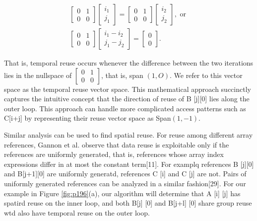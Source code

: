 $$
\begin{gathered}
{\left[\begin{array}{ll}
0 & 1 \\
0 & 0
\end{array}\right]\left[\begin{array}{l}
i_1 \\
j_1
\end{array}\right]=\left[\begin{array}{ll}
0 & 1 \\
0 & 0
\end{array}\right]\left[\begin{array}{l}
i_2 \\
j_2
\end{array}\right], \text { or }} \\
{\left[\begin{array}{ll}
0 & 1 \\
0 & 0
\end{array}\right]\left[\begin{array}{c}
i_1-i_2 \\
j_1-j_2
\end{array}\right]=\left[\begin{array}{l}
0 \\
0
\end{array}\right] .}
\end{gathered}
$$


That is, temporal reuse occurs whenever the difference between
the two iterations lies in the nullspace of \(
	\left[\begin{array}{ll}
		0 & 1 \\
		0 & 0
		\end{array}\right] \), that is,
span ${(1, O)}$. We refer to this vector space as the temporal reuse
vector space. This mathematical approach succinctly captures the
intuitive concept that the direction of reuse of B [j][0] lies along
the outer loop. This approach can handle more complicated access
patterns such as C[i+j] by representing their reuse vector space
as Span${ (1, -1)}$.

Similar analysis can be used to find spatial reuse. For reuse
among different array references, Gannon et al. observe that data
reuse is exploitable only if the references are uniformly generated,
that is, references whose array index expressions differ in at most
the constant term[11]. For examplq references B [j][0] and
B[j+1][0] are uniformly generatd, references C [i] and C [j]
are not. Pairs of uniformly generated references can be analyzed in
a similar fashion[29]. For our example in Figure \ref{fig:p196}(a), our algorithm
will determine that A [i] [j] has spatird reuse on the inner loop,
and both B[j] [0] and B[j+l] [0] share group reuse wtd also
have temporal reuse on the outer loop.

